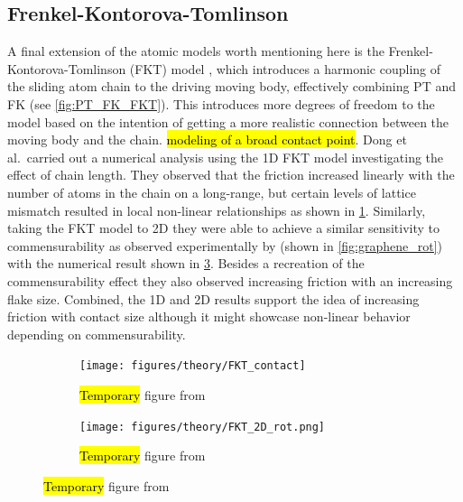 \subsection{Frenkel-Kontorova-Tomlinson}
A final extension of the atomic models worth mentioning here is the
Frenkel-Kontorova-Tomlinson (\acrshort{FKT}) model \cite{weiss_dry_1997}, which
introduces a harmonic coupling of the sliding atom chain to the driving moving
body, effectively combining \acrshort{PT} and \acrshort{FK} (see \cref{fig:PT_FK_FKT}). This introduces
more degrees of freedom to the model based on the intention of getting a more realistic connection between the moving body and the chain. 
\hl{modeling of a broad contact point}. Dong et al.\ carried out a numerical
analysis using the 1D \acrshort{FKT} model investigating the effect of chain
length. They observed that the friction increased linearly with the number of atoms
in the chain on a long-range, but certain levels of lattice mismatch resulted in local non-linear relationships as shown in \cref{fig:FKT_contact}. Similarly, taking the
\acrshort{FKT} model to 2D they were able to achieve a similar sensitivity to
commensurability as observed experimentally by \cite{DIENWIEBEL2005197} (shown in
\cref{fig:graphene_rot}) with the numerical result shown in \cref{fig:FKT_2D_rot}. Besides a recreation of the commensurability effect they also observed increasing friction with an increasing flake size. Combined, the 1D and 2D results support the idea of increasing friction with contact size although it might showcase non-linear behavior depending on commensurability.


\begin{figure}[H]
  \centering
  \begin{subfigure}[t]{0.49\textwidth}
      \centering
      \texttt{[image: figures/theory/FKT\_contact]}
      \label{fig:FKT_contact}
      \caption{\hl{Temporary} figure from \cite{Yalin_2011} }
  \end{subfigure}
  \hfill
  \begin{subfigure}[t]{0.49\textwidth}
      \centering
      \texttt{[image: figures/theory/FKT\_2D\_rot.png]}
      \label{fig:FKT_2D_rot}
      \caption{\hl{Temporary} figure from \cite{Yalin_2011} }
  \end{subfigure}
  \hfill
\end{figure}





